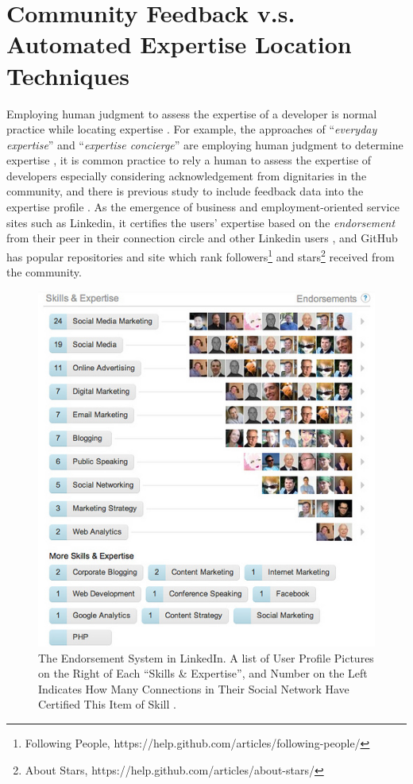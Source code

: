 \section{Community Feedback v.s. Automated Expertise Location Techniques}

Employing human judgment to assess the expertise of a developer is normal practice while locating expertise \cite{mcdonald1998just}. For example, the approaches of ``\textit{everyday expertise}'' and ``\textit{expertise concierge}'' are employing human judgment to determine expertise \cite{mcdonald1998just}, it is common practice to rely a human to assess the expertise of developers especially considering acknowledgement from dignitaries in the community, and there is previous study to include feedback data into the expertise profile \cite{Reichling2007}. As the emergence of business and employment-oriented service sites such as Linkedin, it certifies the users' expertise based on the \textit{endorsement} from their peer in their connection circle and other Linkedin users \cite{linkedin}, and GitHub has popular repositories and site which rank followers\footnote{Following People, https://help.github.com/articles/following-people/} and stars\footnote{About Stars, https://help.github.com/articles/about-stars/} received from the community.

\begin{figure}
\includegraphics[width = 0.6\columnwidth]{linkedin-endorsements.jpg}
\centering
\caption{The Endorsement System in LinkedIn. A list of User Profile Pictures on the Right of Each ``Skills \& Expertise'', and Number on the Left Indicates How Many Connections in Their Social Network Have Certified This Item of Skill \cite{endorsement}.}
\label{endorsement}
\end{figure}

